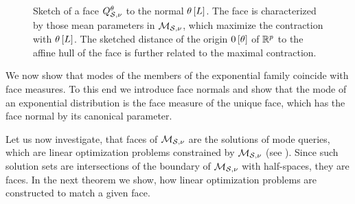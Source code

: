 
\begin{figure}[t]
    \begin{center}
        
    \end{center}
    \caption{Sketch of a face $Q^{\theta}_{\mathcal{S},\nu}$ to the normal $\theta\left[L\right]$.
    The face is characterized by those mean parameters in $\mathcal{M}_{\mathcal{S},\nu}$, which maximize the contraction with $\theta\left[L\right]$.
    The sketched distance of the origin $0\left[\theta\right]$ of $\mathbb{R}^{p}$ to the affine hull of the face is further related to the maximal contraction.
    }\label{fig:meansetSketchFace}
\end{figure}

We now show that modes of the members of the exponential family coincide with face measures.
To this end we introduce face normals and show that the mode of an exponential distribution is the face measure of the unique face, which has the face normal by its canonical parameter.


Let us now investigate, that faces of $\mathcal{M}_{\mathcal{S},\nu}$ are the solutions of mode queries, which are linear optimization problems constrained by $\mathcal{M}_{\mathcal{S},\nu}$ (see ).
Since such solution sets are intersections of the boundary of $\mathcal{M}_{\mathcal{S},\nu}$ with half-spaces, they are faces.
In the next theorem we show, how linear optimization problems are constructed to match a given face.

